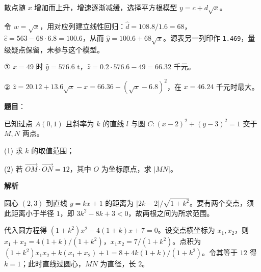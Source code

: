 \begin{answer}

散点随 $x$ 增加而上升，增速逐渐减缓，选择平方根模型 $y=c+d\sqrt x$。


令 $w=\sqrt x$，用对应列建立线性回归：$\widehat d=108.8/1.6=68$，$\widehat c=563-68\cdot6.8=100.6$，从而 $\widehat y=100.6+68\sqrt x$。源表另一列印作 \texttt{1.469}，量级疑点保留，未参与这个模型。


① $x=49$ 时 $\widehat y=576.6$ t，$\widehat z=0.2\cdot576.6-49=66.32$ 千元。

② $\widehat z=20.12+13.6\sqrt x-x=66.36-(\sqrt x-6.8)^2$，在 $x=46.24$ 千元时最大。




\end{answer}
\begin{answer}

\textbf{题目}：

已知过点 $A(0,1)$ 且斜率为 $k$ 的直线 $l$ 与圆 $C:(x-2)^2+(y-3)^2=1$ 交于 $M,N$ 两点。

(1) 求 $k$ 的取值范围；

(2) 若 $\overrightarrow{OM}\cdot\overrightarrow{ON}=12$，其中 $O$ 为坐标原点，求 $|MN|$。

\textbf{解析}


圆心 $(2,3)$ 到直线 $y=kx+1$ 的距离为 $|2k-2|/\sqrt{1+k^2}$。要有两个交点，须此距离小于半径 $1$，即 $3k^2-8k+3<0$，故两根之间为所求范围。


代入圆方程得 $(1+k^2)x^2-4(1+k)x+7=0$。设交点横坐标为 $x_1,x_2$，则 $x_1+x_2=4(1+k)/(1+k^2)$，$x_1x_2=7/(1+k^2)$。点积为 $(1+k^2)x_1x_2+k(x_1+x_2)+1=8+4k(1+k)/(1+k^2)$。令其等于 $12$ 得 $k=1$；此时直线过圆心，$MN$ 为直径，长 $2$。



\end{answer}
